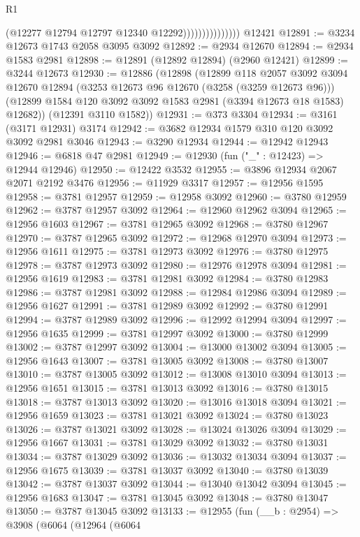 \begin{lexlean}{R1}
\begin{coremodule}
                                (@12277 @12794 @12797 @12340 @12292)))))))))))))))
    @12421
@12891 := @3234 @12673 @1743 @2058 @3095 @3092
@12892 := @2934 @12670
@12894 := @2934 @1583 @2981
@12898 := @12891 (@12892 @12894) (@2960 @12421)
@12899 := @3244 @12673
@12930 := @12886
    (@12898
      (@12899
        @118
        @2057
        @3092
        @3094
        @12670
        @12894
        (@3253 @12673 @96 @12670 (@3258 (@3259 @12673 @96)))
        (@12899 @1584 @120 @3092 @3092 @1583 @2981 (@3394 @12673 @18 @1583) @12682))
      (@12391 @3110 @1582))
@12931 := @373 @3304
@12934 := @3161 (@3171 @12931) @3174
@12942 := @3682 @12934 @1579 @310 @120 @3092 @3092 @2981 @3046
@12943 := @3290 @12934
@12944 := @12942 @12943
@12946 := @6818 @47 @2981
@12949 := @12930 (fun ("_" : @12423) => @12944 @12946)
@12950 := @12422 @3532
@12955 := @3896 @12934 @2067 @2071 @2192 @3476
@12956 := @11929 @3317
@12957 := @12956 @1595
@12958 := @3781 @12957
@12959 := @12958 @3092
@12960 := @3780 @12959
@12962 := @3787 @12957 @3092
@12964 := @12960 @12962 @3094
@12965 := @12956 @1603
@12967 := @3781 @12965 @3092
@12968 := @3780 @12967
@12970 := @3787 @12965 @3092
@12972 := @12968 @12970 @3094
@12973 := @12956 @1611
@12975 := @3781 @12973 @3092
@12976 := @3780 @12975
@12978 := @3787 @12973 @3092
@12980 := @12976 @12978 @3094
@12981 := @12956 @1619
@12983 := @3781 @12981 @3092
@12984 := @3780 @12983
@12986 := @3787 @12981 @3092
@12988 := @12984 @12986 @3094
@12989 := @12956 @1627
@12991 := @3781 @12989 @3092
@12992 := @3780 @12991
@12994 := @3787 @12989 @3092
@12996 := @12992 @12994 @3094
@12997 := @12956 @1635
@12999 := @3781 @12997 @3092
@13000 := @3780 @12999
@13002 := @3787 @12997 @3092
@13004 := @13000 @13002 @3094
@13005 := @12956 @1643
@13007 := @3781 @13005 @3092
@13008 := @3780 @13007
@13010 := @3787 @13005 @3092
@13012 := @13008 @13010 @3094
@13013 := @12956 @1651
@13015 := @3781 @13013 @3092
@13016 := @3780 @13015
@13018 := @3787 @13013 @3092
@13020 := @13016 @13018 @3094
@13021 := @12956 @1659
@13023 := @3781 @13021 @3092
@13024 := @3780 @13023
@13026 := @3787 @13021 @3092
@13028 := @13024 @13026 @3094
@13029 := @12956 @1667
@13031 := @3781 @13029 @3092
@13032 := @3780 @13031
@13034 := @3787 @13029 @3092
@13036 := @13032 @13034 @3094
@13037 := @12956 @1675
@13039 := @3781 @13037 @3092
@13040 := @3780 @13039
@13042 := @3787 @13037 @3092
@13044 := @13040 @13042 @3094
@13045 := @12956 @1683
@13047 := @3781 @13045 @3092
@13048 := @3780 @13047
@13050 := @3787 @13045 @3092
@13133 := @12955
    (fun (__b : @2954) =>
    @3908
      (@6064
        (@12964
          (@6064

\end{coremodule}
\end{lexlean}
